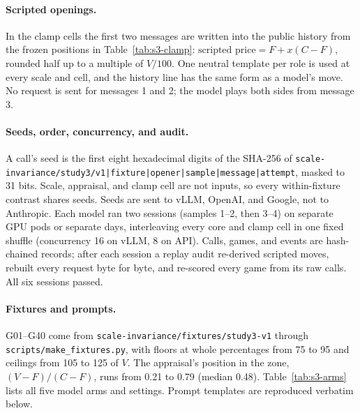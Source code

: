 \paragraph{Scripted openings.} In the clamp cells the first two messages are written into the public history from the frozen positions in Table~\ref{tab:s3-clamp}: $\text{scripted price} = F + x(C - F)$, rounded half up to a multiple of $V/100$. One neutral template per role is used at every scale and cell, and the history line has the same form as a model's move. No request is sent for messages 1 and 2; the model plays both sides from message 3.

\paragraph{Seeds, order, concurrency, and audit.} A call's seed is the first eight hexadecimal digits of the SHA-256 of \texttt{scale-invariance/study3/v1|fixture|opener|sample|message|attempt}, masked to 31 bits. Scale, appraisal, and clamp cell are not inputs, so every within-fixture contrast shares seeds. Seeds are sent to vLLM, OpenAI, and Google, not to Anthropic. Each model ran two sessions (samples 1--2, then 3--4) on separate GPU pods or separate days, interleaving every core and clamp cell in one fixed shuffle (concurrency 16 on vLLM, 8 on API). Calls, games, and events are hash-chained records; after each session a replay audit re-derived scripted moves, rebuilt every request byte for byte, and re-scored every game from its raw calls. All six sessions passed.

\paragraph{Fixtures and prompts.} G01--G40 come from \texttt{scale-invariance/fixtures/study3-v1} through \texttt{scripts/make\_fixtures.py}, with floors at whole percentages from 75 to 95 and ceilings from 105 to 125 of $V$. The appraisal's position in the zone, $(V - F)/(C - F)$, runs from 0.21 to 0.79 (median 0.48). Table~\ref{tab:s3-arms} lists all five model arms and settings. Prompt templates are reproduced verbatim below.



\FloatBarrier


